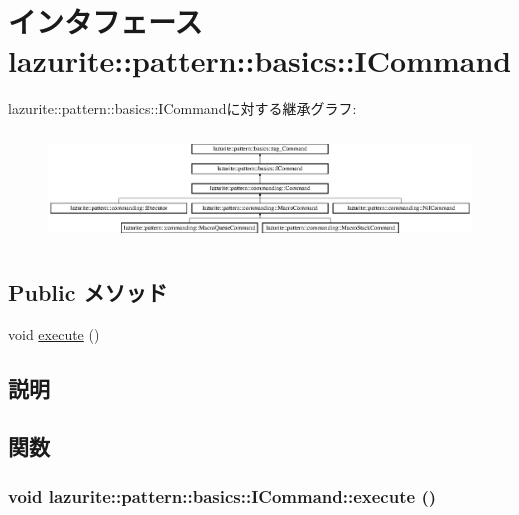 \hypertarget{interfacelazurite_1_1pattern_1_1basics_1_1_i_command}{
\section{インタフェース lazurite::pattern::basics::ICommand}
\label{interfacelazurite_1_1pattern_1_1basics_1_1_i_command}
}
lazurite::pattern::basics::ICommandに対する継承グラフ:\begin{figure}[H]
\begin{center}
\leavevmode
\includegraphics[height=2.93501cm]{interfacelazurite_1_1pattern_1_1basics_1_1_i_command}
\end{center}
\end{figure}
\subsection*{Public メソッド}
\begin{DoxyCompactItemize}
\item 
void \hyperlink{interfacelazurite_1_1pattern_1_1basics_1_1_i_command_ab89391b5d7cf0be8aabc0f4c8369c8e6}{execute} ()
\end{DoxyCompactItemize}


\subsection{説明}


\subsection{関数}
\hypertarget{interfacelazurite_1_1pattern_1_1basics_1_1_i_command_ab89391b5d7cf0be8aabc0f4c8369c8e6}{
\subsubsection[{execute}]{\setlength{\rightskip}{0pt plus 5cm}void lazurite::pattern::basics::ICommand::execute ()}}
\label{interfacelazurite_1_1pattern_1_1basics_1_1_i_command_ab89391b5d7cf0be8aabc0f4c8369c8e6}


